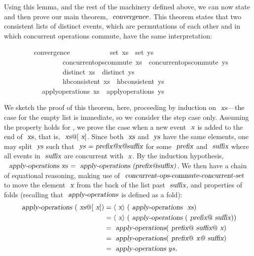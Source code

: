 \documentclass[acmlarge,review,anonymous]{acmart}\settopmatter{printfolios=true}
\begin{document}
Using this lemma, and the rest of the machinery defined above, we can now state and then prove our main theorem, $\isa{convergence}$.
This theorem states that two consistent lists of distinct events, which are permutations of each other and in which concurrent operations commute, have the same interpretation:
\\
\begin{isabellebody}
\ \ \ \ \ \ \ \  convergence{\isacharcolon}\isanewline
\ \ \ \ \ \ \ \ \ \ \ {\isachardoublequoteopen}set\ xs\ {\isacharequal}\ set\ ys{\isachardoublequoteclose}\isanewline
\ \ \ \ \ \ \ \ \ \ \ \ \ \ \ \ \ {\isachardoublequoteopen}concurrent{\isacharunderscore}ops{\isacharunderscore}commute\ xs{\isachardoublequoteclose}\ \ {\isachardoublequoteopen}concurrent{\isacharunderscore}ops{\isacharunderscore}commute\ ys{\isachardoublequoteclose}\isanewline
\ \ \ \ \ \ \ \ \ \ \ \ \ \ \ \ \ {\isachardoublequoteopen}distinct\ xs{\isachardoublequoteclose}\ \ {\isachardoublequoteopen}distinct\ ys{\isachardoublequoteclose}\isanewline
\ \ \ \ \ \ \ \ \ \ \ \ \ \ \ \ \ {\isachardoublequoteopen}hb{\isacharunderscore}consistent\ xs{\isachardoublequoteclose}\ \ {\isachardoublequoteopen}hb{\isacharunderscore}consistent\ ys{\isachardoublequoteclose}\isanewline
\ \ \ \ \ \ \ \ \ \ \ {\isachardoublequoteopen}apply{\isacharunderscore}operations\ xs\ {\isacharequal}\ apply{\isacharunderscore}operations\ ys{\isachardoublequoteclose}\isanewline
\end{isabellebody}

We sketch the proof of this theorem, here, proceeding by induction on $\isa{xs}$---the case for the empty list is immediate, so we consider the step case only.
Assuming the property holds for , we prove the case when a new event $\isa{x}$ is added to the end of $\isa{xs}$, that is, $\isa{xs}@[\isa{x}]$.
Since both $\isa{xs}$ and $\isa{ys}$ have the same elements, one may split $\isa{ys}$ such that $\isa{ys = prefix@x@suffix}$ for some $\isa{prefix}$ and $\isa{suffix}$ where all events in $\isa{suffix}$ are concurrent with $\isa{x}$.
By the induction hypothesis, $\isa{\isa{apply-operations}\ xs = \isa{apply-operations}\ (prefix@suffix)}$.
We then have a chain of equational reasoning, making use of $\isa{concurrent-ops-commute-concurrent-set}$ to move the element $\isa{x}$ from the back of the list past $\isa{suffix}$, and properties of folds (recalling that $\isa{apply-operations}$ is defined as a fold):
\begin{align*}
  \isa{apply-operations}\ (\isa{xs}@[\isa{x}])
  &= \langle\isa{x}\rangle\ (\isa{apply-operations}\ \isa{xs}) \\
  &= \langle\isa{x}\rangle\ (\isa{apply-operations}\ (\isa{prefix}@\isa{suffix}))\\
  &= \isa{apply-operations} (\isa{prefix}@\isa{suffix}@\isa{x}) \\
  &= \isa{apply-operations} (\isa{prefix}@\isa{x@\isa{suffix}}) \\
  &= \isa{apply-operations}\ ys.
\end{align*}
\end{document}
